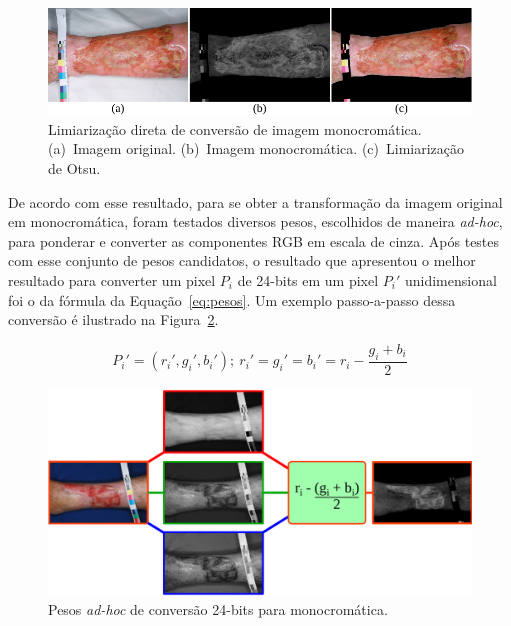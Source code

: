 \begin{figure}[!htb]
\centering
\includegraphics[scale=1.15]{_fig/otsu_phase.pdf}
\caption[Limiarização direta de conversão de imagem monocromática]{Limiarização direta de conversão de imagem monocromática.
(a)~Imagem original.
(b)~Imagem monocromática.
(c)~Limiarização de Otsu.}
\label{fig:conv_falha}
\end{figure}

De acordo com esse resultado, para se obter a transformação da imagem original em monocromática, foram testados diversos pesos, escolhidos de maneira \textit{ad-hoc}, para ponderar e converter as componentes RGB em escala de cinza.
Após testes com esse conjunto de pesos candidatos, o resultado que apresentou o melhor resultado para converter um pixel $P_i$ de 24-bits em um pixel $P_i'$ unidimensional foi o da fórmula da Equação~\ref{eq:pesos}.
Um exemplo passo-a-passo dessa conversão é ilustrado na Figura~\ref{fig:monocromatica}.

\begin{equation}\label{eq:pesos}
    P_i' = (r_i', g_i', b_i');~r_i' = g_i' = b_i' = r_i - \frac{g_i + b_i}{2}
\end{equation}

\begin{figure}[!htb]
\centering
\includegraphics[scale=.75]{_fig/mono.pdf}
\caption[Pesos \textit{ad-hoc} de conversão 24-bits para monocromática]{Pesos \textit{ad-hoc} de conversão 24-bits para monocromática.}
\label{fig:monocromatica}
\end{figure}


